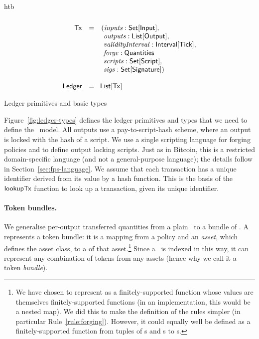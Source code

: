 \begin{ruledfigure}{htb}
\begin{displaymath}
\begin{array}{rll}
    \\
    \mathsf{Tx} &=&(\mathit{inputs}: \textsf{Set}[\textsf{Input}],\\
               & &\ \mathit{outputs}: \textsf{List}[\textsf{Output}],\\
               & &\ \mathit{validityInterval}: \textsf{Interval}[\textsf{Tick}],\\
               & &\ \mathit{forge}: \textsf{Quantities}\\
               & &\ \mathit{scripts}: \textsf{Set}[\textsf{Script}],\\
               & &\ \mathit{sigs}: \textsf{Set}[\textsf{Signature}])\\
    \\
    \textsf{Ledger} &=&\!\textsf{List}[\mathsf{Tx}]\\
    \end{array}
  \end{displaymath}
  \caption{Ledger primitives and basic types}
  \label{fig:ledger-types}
\end{ruledfigure}
%
Figure~\ref{fig:ledger-types} defines the ledger primitives and types that we need to define the \UTXOma\ model.
All outputs use a pay-to-script-hash scheme, where an output is locked with the hash of a script. We use a single scripting language for forging policies and to define output locking scripts. Just as in Bitcoin, this is a restricted domain-specific language (and not a general-purpose language); the details follow in Section~\ref{sec:fps-language}.
We assume that each transaction has a unique identifier derived from its value by a hash function. This is the basis of the $\mathsf{lookupTx}$ function to look up a transaction, given its unique identifier.

\paragraph{Token bundles.}

We generalise per-output transferred quantities from a plain \Quantity\ to a bundle of \Quantities.
A \Quantities{} represents a token bundle: it is a mapping from a policy and an \emph{asset}, which defines the asset class, to a \Quantity{} of that asset.\footnote{
  We have chosen to represent \Quantities{} as a finitely-supported function whose values are themselves finitely-supported functions (in an implementation, this would be a nested map).
  We did this to make the definition of the rules simpler (in particular Rule~\ref{rule:forging}).
  However, it could equally well be defined as a finitely-supported function from tuples of \Policy{}s and \Asset{}s to \Quantity{}s.
}
Since a \Quantities\ is indexed in this way, it can represent any combination of tokens from any assets (hence why we call it a token \emph{bundle}).


